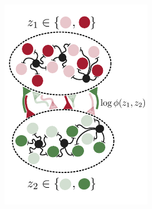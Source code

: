 \begin{figure}[t!]
  \centering
  \begin{subfigure}[b]{1.6in}
    \centering
    \caption{}
    \vspace{-.3in}
    \includegraphics[width=\textwidth]{figures/ch7/example_population2.pdf}
    \label{fig:representation_population}
  \end{subfigure}
  \begin{subfigure}[b]{1.9in}
    \centering
    \caption{}
    \vspace{-.3in}

\end{subfigure}
\end{figure}
